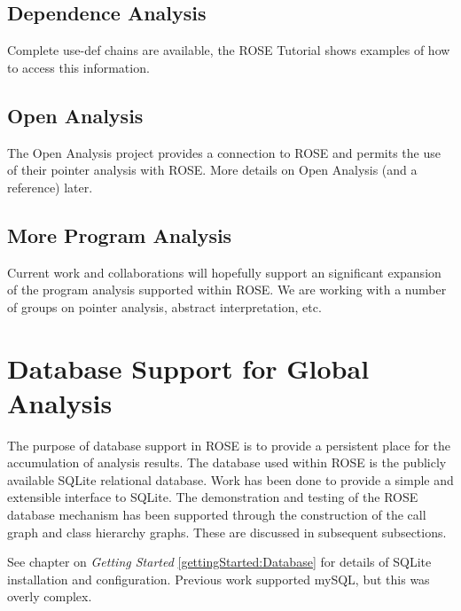 \subsection{Dependence Analysis}

   Complete use-def chains are available, the ROSE Tutorial shows examples of
how to access this information.

\subsection{Open Analysis}

   The Open Analysis project provides a connection to ROSE and permits
the use of their pointer analysis with ROSE.  More details on Open Analysis
(and a reference) later.

\subsection{More Program Analysis}

   Current work and collaborations will hopefully support an significant 
expansion of the program analysis supported within ROSE.  We are working with
a number of groups on pointer analysis, abstract interpretation, etc.

\section{Database Support for Global Analysis}
\label{RoseExamples:RoseTutorial:Database}

   The purpose of database support in ROSE is to provide a persistent
place for the accumulation of analysis results.  The database used within ROSE
is the publicly available SQLite relational database.  Work has
been done to provide a simple and extensible interface to SQLite.  The 
demonstration and testing of the ROSE database mechanism has been supported 
through the construction of the call graph and class hierarchy graphs. These
are discussed in subsequent subsections.

See chapter on {\em Getting Started} \ref{gettingStarted:Database}
for details of SQLite installation and configuration.  Previous work
supported mySQL, but this was overly complex.

